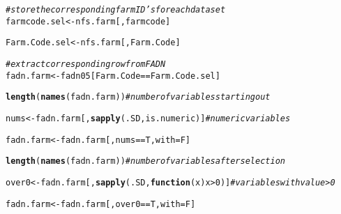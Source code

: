 \documentclass{article}\usepackage[]{graphicx}\usepackage[]{color}
\makeatletter
\newcommand{\hlcom}[1]{\textcolor[rgb]{0.678,0.584,0.686}{\textit{#1}}}%
\newcommand{\hlkwd}[1]{\textcolor[rgb]{0.737,0.353,0.396}{\textbf{#1}}}%
\newenvironment{kframe}{%
 \def\at@end@of@kframe{}%
 \ifinner\ifhmode%
  \def\at@end@of@kframe{\end{minipage}}%
  \begin{minipage}{\columnwidth}%
 \fi\fi%
 \def\FrameCommand##1{\hskip\@totalleftmargin \hskip-\fboxsep
 \colorbox{shadecolor}{##1}\hskip-\fboxsep
     \hskip-\linewidth \hskip-\@totalleftmargin \hskip\columnwidth}%
 \MakeFramed {\advance\hsize-\width
   \@totalleftmargin\z@ \linewidth\hsize
   \@setminipage}}%
 {\par\unskip\endMakeFramed%
 \at@end@of@kframe}
\newenvironment{knitrout}{}{} %
\makeatother
\begin{document}
\begin{flushleft}
\begin{knitrout}
\begin{kframe}
\begin{alltt}
\hlcom{# store the corresponding farm ID's for each dataset}
farmcode.sel <- nfs.farm[, farmcode]
\end{alltt}


{\ttfamily\noindent\bfseries\color{errorcolor}{\#\# Error: object 'nfs.farm' not found}}\begin{alltt}
Farm.Code.sel <- nfs.farm[, Farm.Code]
\end{alltt}


{\ttfamily\noindent\bfseries\color{errorcolor}{\#\# Error: object 'nfs.farm' not found}}\begin{alltt}


\hlcom{# extract corresponding row from FADN}
fadn.farm <- fadn05[Farm.Code == Farm.Code.sel]
\end{alltt}


{\ttfamily\noindent\bfseries\color{errorcolor}{\#\# Error: object 'fadn05' not found}}\begin{alltt}
\hlkwd{length}(\hlkwd{names}(fadn.farm))  \hlcom{# number of variables starting out}
\end{alltt}


{\ttfamily\noindent\bfseries\color{errorcolor}{\#\# Error: object 'fadn.farm' not found}}\begin{alltt}
nums <- fadn.farm[, \hlkwd{sapply}(.SD, is.numeric)]  \hlcom{# numeric variables}
\end{alltt}


{\ttfamily\noindent\bfseries\color{errorcolor}{\#\# Error: object 'fadn.farm' not found}}\begin{alltt}
fadn.farm <- fadn.farm[, nums == T, with = F]
\end{alltt}


{\ttfamily\noindent\bfseries\color{errorcolor}{\#\# Error: object 'fadn.farm' not found}}\begin{alltt}
\hlkwd{length}(\hlkwd{names}(fadn.farm))  \hlcom{# number of variables after selection}
\end{alltt}


{\ttfamily\noindent\bfseries\color{errorcolor}{\#\# Error: object 'fadn.farm' not found}}\begin{alltt}
over0 <- fadn.farm[, \hlkwd{sapply}(.SD, \hlkwd{function}(x) x > 0)]  \hlcom{# variables with value > 0}
\end{alltt}


{\ttfamily\noindent\bfseries\color{errorcolor}{\#\# Error: object 'fadn.farm' not found}}\begin{alltt}
fadn.farm <- fadn.farm[, over0 == T, with = F]
\end{alltt}



\end{kframe}
\end{knitrout}
\end{flushleft}
\end{document}

